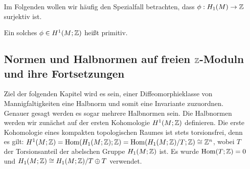 Im Folgenden wollen wir häufig den Spezialfall betrachten, dass $\phi: H_1(M) \to \mathbb{Z}$ surjektiv ist. 
\begin{defn}
	Ein solches $\phi \in H^1(M;\mathbb{Z})$ heißt primitiv.
\end{defn}

\subsection{Normen und Halbnormen auf freien $\mathbb{Z}$-Moduln und ihre Fortsetzungen}
    
    Ziel der folgenden Kapitel wird es sein, einer Diffeomorphieklasse von Mannigfaltigkeiten eine Halbnorm und somit eine Invariante zuzuordnen. Genauer gesagt werden es sogar mehrere Halbnormen sein. Die Halbnormen werden wir zunächst auf der ersten Kohomologie $H^1(M;\mathbb{Z})$ definieren. Die erste Kohomologie eines kompakten topologischen Raumes ist stets torsionsfrei, denn es gilt: $H^1(M;\mathbb{Z}) = \operatorname{Hom}(H_1(M;\mathbb{Z});\mathbb{Z}) = \operatorname{Hom}(H_1(M;\mathbb{Z})/T;\mathbb{Z}) \cong \mathbb{Z}^n$, wobei $T$ der Torsionsanteil der abelschen Gruppe $H_1(M;\mathbb{Z})$ ist. Es wurde $\operatorname{Hom}(T;\mathbb{Z})=0$ und $H_1(M;\mathbb{Z}) \cong H_1(M;\mathbb{Z})/T \oplus T$ verwendet.

